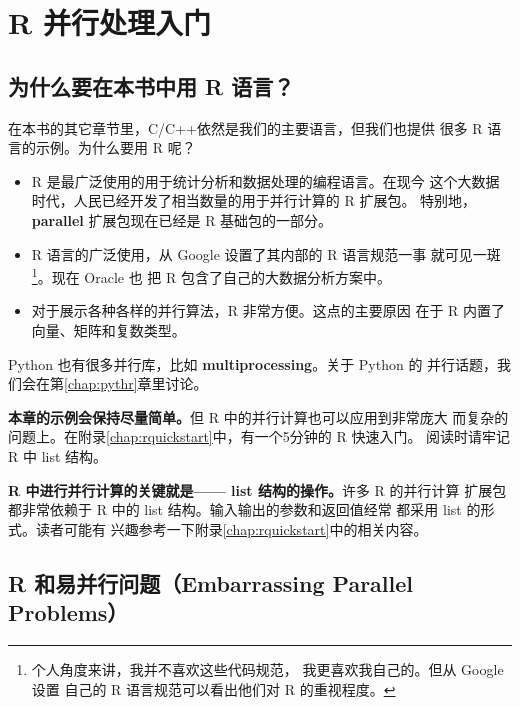 \chapter{R 并行处理入门}
\label{chap:r}

\section{为什么要在本书中用 R 语言？}

在本书的其它章节里，C/C++依然是我们的主要语言，但我们也提供
很多 R 语言的示例。为什么要用 R 呢？

\begin{itemize}

\item R 是最广泛使用的用于统计分析和数据处理的编程语言。在现今
这个大数据时代，人民已经开发了相当数量的用于并行计算的 R 扩展包。
特别地，{\bf parallel} 扩展包现在已经是 R 基础包的一部分。

\item R 语言的广泛使用，从 Google 设置了其内部的 R 语言规范一事
就可见一斑\footnote{个人角度来讲，我并不喜欢这些代码规范，
我更喜欢我自己的。但从 Google 设置
自己的 R 语言规范可以看出他们对 R 的重视程度。}。现在 Oracle 也
把 R 包含了自己的大数据分析方案中。

\item 对于展示各种各样的并行算法，R 非常方便。这点的主要原因
在于 R 内置了向量、矩阵和复数类型。

\end{itemize}

Python 也有很多并行库，比如 {\bf multiprocessing}。关于 Python 的
并行话题，我们会在第\ref{chap:pythr}章里讨论。

{\bf 本章的示例会保持尽量简单。}但 R 中的并行计算也可以应用到非常庞大
而复杂的问题上。在附录\ref{chap:rquickstart}中，有一个5分钟的 R 快速入门。
阅读时请牢记 R 中 list 结构。

{\bf R 中进行并行计算的关键就是—— list 结构的操作。}许多 R 的并行计算
扩展包都非常依赖于 R 中的 list 结构。输入输出的参数和返回值经常
都采用 list 的形式。读者可能有
兴趣参考一下附录\ref{chap:rquickstart}中的相关内容。

\section{R 和易并行问题（Embarrassing Parallel Problems）}

